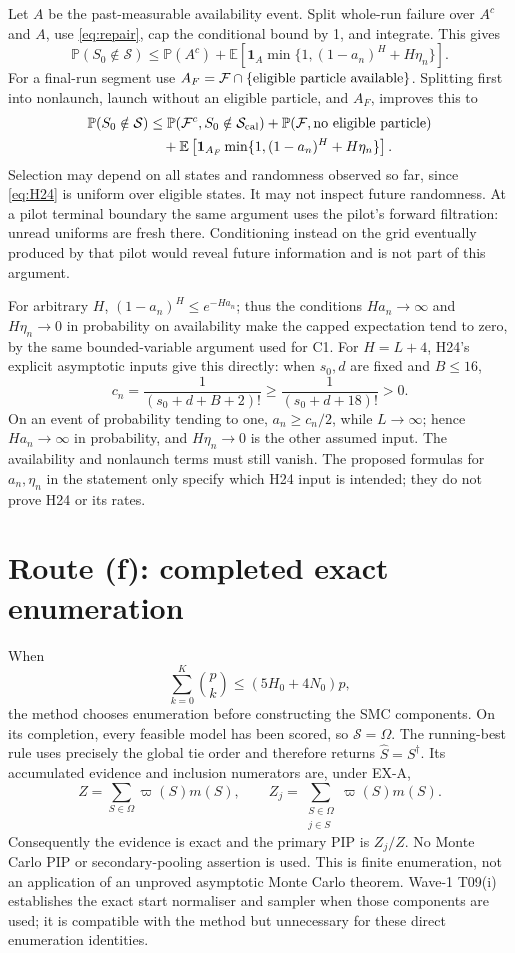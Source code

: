 ﻿\documentclass[11pt]{article}
\newcommand{\Pp}{\mathbb P}
\newcommand{\E}{\mathbb E}
\newcommand{\1}{\mathbf 1}
\newcommand{\Sc}{\mathcal S}
\newcommand{\Fc}{\mathcal F}
\newcommand{\Om}{\Omega}
\begin{document}
Let \(A\) be the past-measurable availability event. Split whole-run failure
over \(A^c\) and \(A\), use \eqref{eq:repair}, cap the conditional
bound by 1, and integrate. This gives
\[
 \Pp(S_0\notin\Sc)
 \le\Pp(A^c)+\E\left[\1_A
   \min\{1,(1-a_n)^H+H\eta_n\}\right].
\]
For a final-run segment use
\(A_F=\Fc\cap\{\hbox{eligible particle available}\}\).
Splitting first into nonlaunch, launch without an eligible particle, and
\(A_F\), improves this to
\begin{align}
 \Pp(S_0\notin\Sc)
 &\le\Pp(\Fc^c,S_0\notin\Sc_{\rm cal})
   +\Pp(\Fc,\hbox{no eligible particle})\notag\\
 &\quad+\E\left[\1_{A_F}
     \min\{1,(1-a_n)^H+H\eta_n\}\right].\label{eq:finalrepair}
\end{align}
Selection may depend on all states and randomness observed so far, since
\eqref{eq:H24} is uniform over eligible states. It may not inspect future
randomness. At a pilot terminal boundary the same argument uses the pilot's
forward filtration: unread uniforms are fresh there. Conditioning instead
on the grid eventually produced by that pilot would reveal future information
and is not part of this argument.

For arbitrary \(H\), \((1-a_n)^H\le e^{-Ha_n}\); thus the conditions
\(Ha_n\to\infty\) and \(H\eta_n\to0\) in probability on availability
make the capped expectation tend to zero, by the same bounded-variable
argument used for C1. For \(H=L+4\), H24's explicit asymptotic inputs give
this directly: when \(s_0,d\) are fixed and \(B\le16\),
\[
 c_n=\frac1{(s_0+d+B+2)!}\ge\frac1{(s_0+d+18)!}>0.
\]
On an event of probability tending to one,
\(a_n\ge c_n/2\), while \(L\to\infty\); hence \(Ha_n\to\infty\)
in probability, and \(H\eta_n\to0\) is the other assumed input.
The availability and nonlaunch terms must still vanish.
The proposed formulas for \(a_n,\eta_n\) in the statement only specify
which H24 input is intended; they do not prove H24 or its rates.

\section{Route (f): completed exact enumeration}
When
\begin{equation}\label{eq:exact}
 \sum_{k=0}^K\binom pk\le(5H_0+4N_0)p,
\end{equation}
the method chooses enumeration before constructing the SMC components.
On its completion, every feasible model has been scored, so \(\Sc=\Om\).
The running-best rule uses precisely the global tie order and therefore
returns \(\widehat S=S^\dagger\). Its accumulated evidence and inclusion
numerators are, under EX-A,
\[
 Z=\sum_{S\in\Om}\varpi(S)m(S),\qquad
 Z_j=\sum_{\substack{S\in\Om\\j\in S}}\varpi(S)m(S).
\]
Consequently the evidence is exact and the primary PIP is \(Z_j/Z\).
No Monte Carlo PIP or secondary-pooling assertion is used.
This is finite enumeration, not an application of an unproved asymptotic
Monte Carlo theorem. Wave-1 T09(i) establishes the exact start normaliser
and sampler when those components are used; it is compatible with the
method but unnecessary for these direct enumeration identities.
\end{document}
